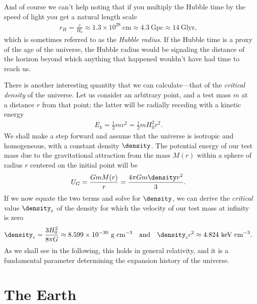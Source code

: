 And of course we can't help noting that if you multiply the Hubble time by the speed
of light you get a natural length scale
\begin{align*}
  r_H = \frac{c}{H_0} \approx 1.3 \times 10^{28}~\text{cm}
  \approx 4.3~\text{Gpc} \approx 14~\text{Glyr},
\end{align*}
which is sometimes referred to as the \emph{Hubble radius}. If the Hubble time is a
proxy of the age of the universe, the Hubble radius would be signaling the distance
of the horizon beyond which anything that happened wouldn't have had time to reach us.

There is another interesting quantity that we can calculate---that of the
\emph{critical density} of the universe. Let us consider an arbitrary point, and
a test mass $m$ at a distance $r$ from that point; the latter will be radially
receding with a kinetic energy
\begin{align*}
  E_k = \frac{1}{2}mv^2 = \frac{1}{2}mH_0^2 r^2.
\end{align*}
We shall make a step forward and assume that the universe is isotropic and
homogeneous, with a constant density $\density$. The potential energy of our test
mass due to the gravitational attraction from the mass $M(r)$ within a sphere of radius
$r$ centered on the initial point will be
\begin{align*}
  U_G = \frac{G m M(r)}{r} = \frac{4\pi Gm \density r^2}{3}.
\end{align*}
If we now equate the two terms and solve for $\density$, we can derive the \emph{critical}
value $\density_c$ of the density for which the velocity of our test mass at infinity
is zero
\begin{align}
  \density_c = \frac{3H_0^2}{8\pi G} \approx 8.599 \times 10^{-30}~\text{g~cm}^{-3}
	\quad\text{and}\quad
	\density_c c^2 \approx 4.824~\text{keV}~\text{cm}^{-3}.
\end{align}
As we shall see in the following, this holds in general relativity, and it is a
fundamental parameter determining the expansion history of the universe.



\section{The Earth}
\label{sec:earth}

